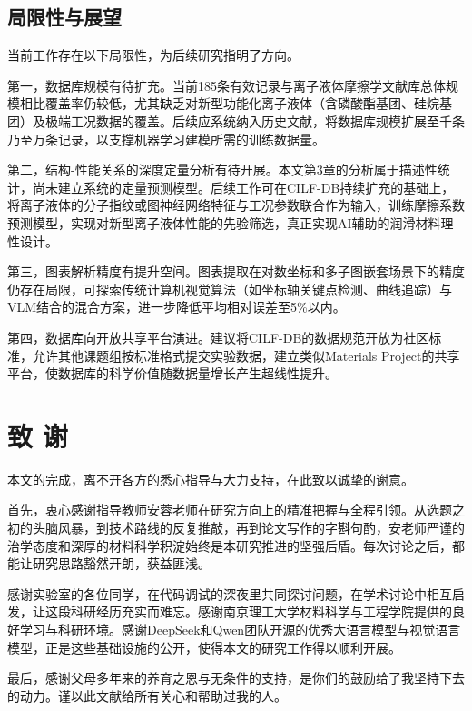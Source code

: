 \hypertarget{ux5c40ux9650ux6027ux4e0eux5c55ux671b}{%
\subsection{局限性与展望}\label{ux5c40ux9650ux6027ux4e0eux5c55ux671b}}

当前工作存在以下局限性，为后续研究指明了方向。

第一，数据库规模有待扩充。当前185条有效记录与离子液体摩擦学文献库总体规模相比覆盖率仍较低，尤其缺乏对新型功能化离子液体（含磷酸酯基团、硅烷基团）及极端工况数据的覆盖。后续应系统纳入历史文献，将数据库规模扩展至千条乃至万条记录，以支撑机器学习建模所需的训练数据量。

第二，结构-性能关系的深度定量分析有待开展。本文第3章的分析属于描述性统计，尚未建立系统的定量预测模型。后续工作可在CILF-DB持续扩充的基础上，将离子液体的分子指纹或图神经网络特征与工况参数联合作为输入，训练摩擦系数预测模型，实现对新型离子液体性能的先验筛选，真正实现AI辅助的润滑材料理性设计。

第三，图表解析精度有提升空间。图表提取在对数坐标和多子图嵌套场景下的精度仍存在局限，可探索传统计算机视觉算法（如坐标轴关键点检测、曲线追踪）与VLM结合的混合方案，进一步降低平均相对误差至5\%以内。

第四，数据库向开放共享平台演进。建议将CILF-DB的数据规范开放为社区标准，允许其他课题组按标准格式提交实验数据，建立类似Materials Project的共享平台，使数据库的科学价值随数据量增长产生超线性提升。

\hypertarget{ux81f4-ux8c22}{%
\section{致 谢}\label{ux81f4-ux8c22}}

本文的完成，离不开各方的悉心指导与大力支持，在此致以诚挚的谢意。

首先，衷心感谢指导教师安蓉老师在研究方向上的精准把握与全程引领。从选题之初的头脑风暴，到技术路线的反复推敲，再到论文写作的字斟句酌，安老师严谨的治学态度和深厚的材料科学积淀始终是本研究推进的坚强后盾。每次讨论之后，都能让研究思路豁然开朗，获益匪浅。

感谢实验室的各位同学，在代码调试的深夜里共同探讨问题，在学术讨论中相互启发，让这段科研经历充实而难忘。感谢南京理工大学材料科学与工程学院提供的良好学习与科研环境。感谢DeepSeek和Qwen团队开源的优秀大语言模型与视觉语言模型，正是这些基础设施的公开，使得本文的研究工作得以顺利开展。

最后，感谢父母多年来的养育之恩与无条件的支持，是你们的鼓励给了我坚持下去的动力。谨以此文献给所有关心和帮助过我的人。

